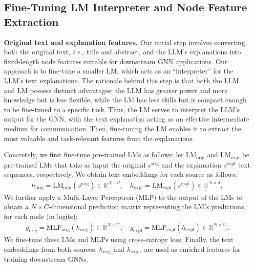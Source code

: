 \documentclass{article}
\newcommand{\ie}{\emph{i.e.,}\xspace}
\begin{document}
\subsection{Fine-Tuning LM Interpreter and Node Feature Extraction}

\textbf{Original text and explanation features.} 
Our initial step involves converting both the original text, \ie title and abstract, and the LLM's explanations into fixed-length node features suitable for downstream GNN applications. Our approach is to fine-tune a smaller LM, which acts as an ``interpreter'' for the LLM's text explanations. The rationale behind this step is that both the LLM and LM possess distinct advantages: the LLM has greater power and more knowledge but is less flexible, while the LM has less skills but is compact enough to be fine-tuned to a specific task. Thus, the LM serves to interpret the LLM's output for the GNN, with the text explanation acting as an effective intermediate medium for communication. Then, fine-tuning the LM enables it to extract the most valuable and task-relevant features from the explanations. 


Concretely, we first fine-tune pre-trained LMs as follows: let $\textrm{LM}_{\textrm{orig}}$ and $\textrm{LM}_{\textrm{expl}}$ be pre-trained LMs that take as input the original $s^{\textrm{orig}}$ and the explanation $s^{\textrm{expl}}$ text sequences, respectively. We obtain text embeddings for each source as follows:
\begin{equation}
    \begin{split}
        h_{\textrm{orig}} = \textrm{LM}_{\textrm{orig}}(s^{\textrm{orig}})\in \mathbb{R}^{N\times d}, \quad 
        h_{\textrm{expl}} = \textrm{LM}_\textrm{expl}(s^{\textrm{expl}})\in \mathbb{R}^{N\times d}.
    \end{split}
\end{equation}
We further apply a Multi-Layer Perceptron (MLP) to the output of the LMs to obtain a $N \times C$-dimensional prediction matrix representing the LM's predictions for each node (in logits):
\begin{equation}
    \begin{split}
        y_{\textrm{orig}}= \textrm{MLP}_{\textrm{orig}}(h_{\textrm{orig}}) \in \mathbb{R}^{N\times C}, \quad 
        y_{\textrm{expl}}= \textrm{MLP}_\textrm{expl}(h_{\textrm{expl}}) \in \mathbb{R}^{N\times C}.
    \end{split}
\end{equation}
We fine-tune these LMs and MLPs using cross-entropy loss. Finally, the text embeddings from both sources, $h_{\textrm{orig}}$ and $h_{\textrm{expl}}$, are used as enriched features for training downstream GNNs.
\end{document}
